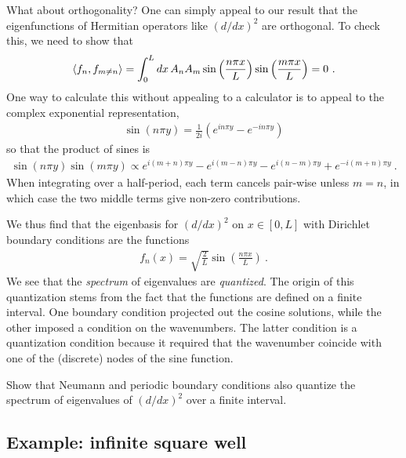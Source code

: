 \documentclass[12pt, oneside]{report}    %
\begin{document}
What about orthogonality? One can simply appeal to our result that the eigenfunctions of Hermitian operators like $(d/dx)^2$ are orthogonal. To check this, we need to show that
\begin{align}
    \langle f_n, f_{m\neq n}\rangle 
    = \int_0^L dx\, A_nA_m 
    \sin\left(\frac{n\pi x}{L}\right)
    \sin\left(\frac{m\pi x}{L}\right)
    = 0 \ .
\end{align}
One way to calculate this without appealing to a calculator is to appeal to the complex exponential representation,
\begin{align}
    \sin(n\pi y) = \frac{1}{2i}\left(e^{in\pi y} - e^{-in\pi y}\right)
\end{align}
so that the product of sines is
\begin{align}
    \sin(n\pi y)\sin(m\pi y)
    \propto 
    e^{i(m+n)\pi y} - e^{i(m-n)\pi y} - e^{i(n-m)\pi y} + e^{-i(m+n)\pi y} \ .
\end{align}
When integrating over a half-period, each term cancels pair-wise unless  $m=n$, in which case the two middle terms give non-zero contributions. 


We thus find that the eigenbasis for $(d/dx)^2$ on $x\in [0,L]$ with Dirichlet boundary conditions are the functions
\begin{align}
    f_n(x) = \sqrt{\frac{2}{L}}\sin\left(\frac{n\pi x}{L}\right) \ .
\end{align}
We see that the \emph{spectrum} of eigenvalues are \emph{quantized}. The origin of this quantization stems from the fact that the functions are defined on a finite interval. One boundary condition projected out the cosine solutions, while the other imposed a condition on the wavenumbers. The latter condition is a quantization condition because it required that the wavenumber coincide with one of the (discrete) nodes of the sine function.

\begin{exercise}
Show that Neumann and periodic boundary conditions also quantize the spectrum of eigenvalues of $(d/dx)^2$ over a finite interval.
\end{exercise}




\subsection{Example: infinite square well}

\end{document}
